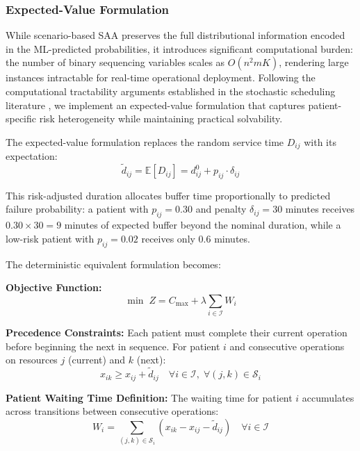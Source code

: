 \documentclass[msom,blindrev]{informs3}
\begin{document}
\subsubsection{Expected-Value Formulation}

While scenario-based SAA preserves the full distributional information encoded in the ML-predicted probabilities, it introduces significant computational burden: the number of binary sequencing variables scales as $O(n^2 m K)$, rendering large instances intractable for real-time operational deployment. Following the computational tractability arguments established in the stochastic scheduling literature \citep{denton2003sequential, mancilla2012sample}, we implement an expected-value formulation that captures patient-specific risk heterogeneity while maintaining practical solvability.

The expected-value formulation replaces the random service time $D_{ij}$ with its expectation:
\begin{equation}
\tilde{d}_{ij} = \mathbb{E}[D_{ij}] = d_{ij}^0 + p_{ij} \cdot \delta_{ij}
\label{eq:expected_duration}
\end{equation}

This risk-adjusted duration allocates buffer time proportionally to predicted failure probability: a patient with $p_{ij} = 0.30$ and penalty $\delta_{ij} = 30$ minutes receives $0.30 \times 30 = 9$ minutes of expected buffer beyond the nominal duration, while a low-risk patient with $p_{ij} = 0.02$ receives only 0.6 minutes.

The deterministic equivalent formulation becomes:

\textbf{Objective Function:}
\begin{equation}
\min \; Z = C_{\max} + \lambda \sum_{i \in \mathcal{I}} W_i
\label{eq:objective}
\end{equation}

\textbf{Precedence Constraints:} Each patient must complete their current operation before beginning the next in sequence. For patient $i$ and consecutive operations on resources $j$ (current) and $k$ (next):
\begin{equation}
x_{ik} \geq x_{ij} + \tilde{d}_{ij} \quad \forall i \in \mathcal{I}, \; \forall (j, k) \in \mathcal{S}_i
\label{eq:precedence}
\end{equation}

\textbf{Patient Waiting Time Definition:} The waiting time for patient $i$ accumulates across transitions between consecutive operations:
\begin{equation}
W_i = \sum_{(j,k) \in \mathcal{S}_i} \left( x_{ik} - x_{ij} - \tilde{d}_{ij} \right) \quad \forall i \in \mathcal{I}
\label{eq:wait_time}
\end{equation}
\end{document}
